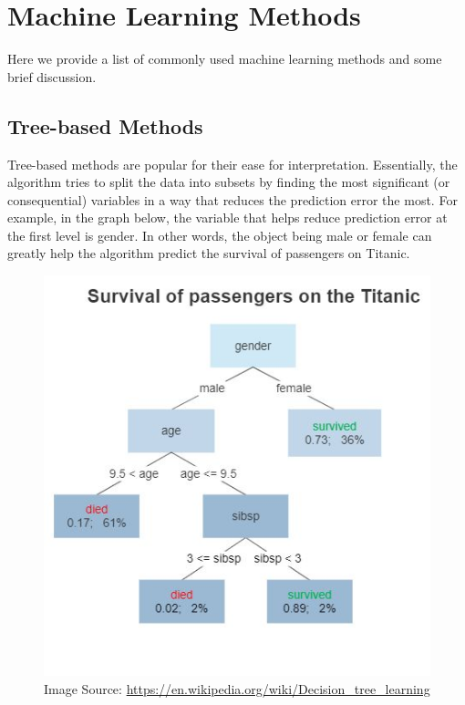 \documentclass[
]{book}
\begin{document}
\hypertarget{machine-learning-methods}{%
\chapter{Machine Learning Methods}\label{machine-learning-methods}}

Here we provide a list of commonly used machine learning methods and some brief discussion.

\hypertarget{tree-based-methods}{%
\section{Tree-based Methods}\label{tree-based-methods}}

Tree-based methods are popular for their ease for interpretation. Essentially, the algorithm tries to split the data into subsets by finding the most significant (or consequential) variables in a way that reduces the prediction error the most. For example, in the graph below, the variable that helps reduce prediction error at the first level is gender. In other words, the object being male or female can greatly help the algorithm predict the survival of passengers on Titanic.

\begin{figure}
\centering
\includegraphics{images/Decision_Tree.jpg}
\caption{Image Source: \url{https://en.wikipedia.org/wiki/Decision_tree_learning}}
\end{figure}
\end{document}
